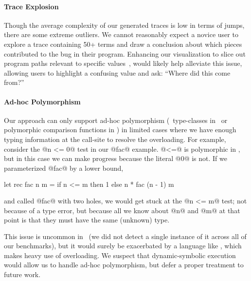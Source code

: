 \paragraph{Trace Explosion}
Though the average complexity of our generated traces is low in terms of
jumps, there are some extreme outliers.
%
We cannot reasonably expect a novice user to explore a trace containing
50+ terms and draw a conclusion about which pieces contributed to the
bug in their program.
%
Enhancing our visualization to slice out program paths relevant to
specific values~\cite{Perera2012-dy}, would likely help alleviate this
issue, allowing users to highlight a confusing value and ask: ``Where
did this come from?''

\paragraph{Ad-hoc Polymorphism}
Our approach can only support ad-hoc polymorphism (\eg\ type-classes in
\haskell\ or polymorphic comparison functions in \ocaml) in limited cases
where we have enough typing information at the call-site to resolve the
overloading. For example, consider the @n <= 0@ test in our @fac@ example.
@<=@ is polymorphic in \ocaml, but in this case we can make progress because
the literal @0@ is not. If we parameterized @fac@ by a lower bound, \eg
%
\begin{code}
  let rec fac n m =
    if n <= m then
      1
    else
      n * fac (n - 1) m
\end{code}
%
and called @fac@ with two holes, we would get stuck at the @n <= m@
test; not because of a type error, but because all we know about
@n@ and @m@ at that point is that they must have the same (unknown)
type.

This issue is uncommon in \ocaml\ (we did not detect a single instance
of it across all of our benchmarks), but it would surely be exacerbated
by a language like \haskell, which makes heavy use of overloading. We
suspect that dynamic-symbolic execution would allow us to handle ad-hoc
polymorphism, but defer a proper treatment to future work.


